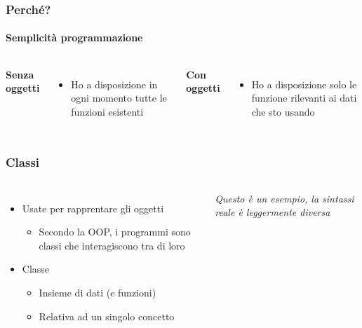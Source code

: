 \begin{contentframe}
    \frametitle{Perché?}
    \framesubtitle{Semplicità programmazione}

    \begin{columns}
        \textbf{Senza oggetti}
        \begin{itemize}
            \item Ho a disposizione in ogni momento tutte le funzioni esistenti
        \end{itemize}
        
        \textbf{Con oggetti}
        \begin{itemize}
            \item Ho a disposizione solo le funzione rilevanti ai dati che sto usando
        \end{itemize}
    \end{columns}
\end{contentframe}


\begin{contentframe}
    \frametitle{Classi}

    \begin{columns}
        \begin{itemize}
            \item Usate per rapprentare gli oggetti
            \begin{itemize}
                \item Secondo la OOP, i programmi sono classi che interagiscono tra di loro
            \end{itemize}

            \bigskip
            \item Classe
            \begin{itemize}
                \item Insieme di dati (e funzioni)
                \item Relativa ad un singolo concetto
            \end{itemize}
        \end{itemize}
        
        \centering
        {
            \footnotesize
            \textit{Questo è un esempio, la sintassi reale è leggermente diversa}
        }
    \end{columns}
\end{contentframe}


